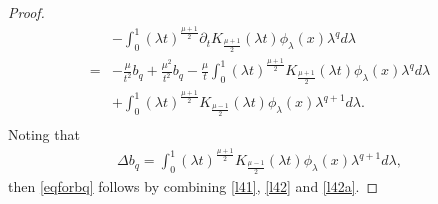 \documentclass[10pt,a4paper]{amsart}
\begin{document}
\begin{proof}
\begin{equation}
\begin{aligned}
&-\int_0^1(\lambda t)^{\frac{\mu+1}{2}}\partial_tK_{\frac{\mu+1}{2}}(\lambda t)\phi_\lambda(x)\lambda^{q}d\lambda\\
=&-\frac{\mu}{t^2}b_q+\frac{\mu^2}{t^2}b_q-\frac{\mu}t\int_0^1(\lambda t)^{\frac{\mu+1}{2}}K_{\frac{\mu+1}{2}}(\lambda t)\phi_\lambda(x)\lambda^{q}d\lambda\\
&+\int_0^1(\lambda t)^{\frac{\mu+1}{2}}K_{\frac{\mu-1}{2}}(\lambda t)\phi_\lambda(x)\lambda^{q+1}d\lambda.\\
\end{aligned}
\end{equation}
Noting that
\begin{equation}\label{l42a}
\begin{aligned}
\Delta b_q=\int_0^1(\lambda t)^{\frac{\mu+1}{2}}K_{\frac{\mu-1}{2}}(\lambda t)\phi_\lambda(x)\lambda^{q+1}d\lambda,
\end{aligned}
\end{equation}
then \eqref{eqforbq} follows by combining \eqref{l41}, \eqref{l42} and \eqref{l42a}.


\end{proof}
\end{document}
